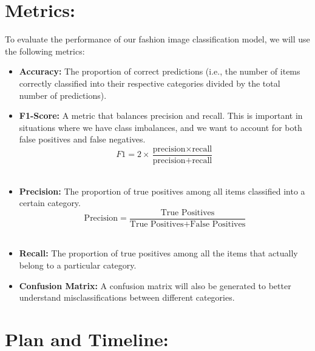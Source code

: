 \documentclass[12pt]{article}
\begin{document}
\section*{Metrics:}
To evaluate the performance of our fashion image classification model, we will use the following metrics:
\begin{itemize}
    \item \textbf{Accuracy:} The proportion of correct predictions (i.e., the number of items correctly classified into their respective categories divided by the total number of predictions).
    \item \textbf{F1-Score:} A metric that balances precision and recall. This is important in situations where we have class imbalances, and we want to account for both false positives and false negatives.
    \begin{equation}
        F1 = 2 \times \frac{\text{precision} \times \text{recall}}{\text{precision} + \text{recall}}
    \end{equation}
    \item \textbf{Precision:} The proportion of true positives among all items classified into a certain category.
    \begin{equation}
        \text{Precision} = \frac{\text{True Positives}}{\text{True Positives} + \text{False Positives}}
    \end{equation}
    \item \textbf{Recall:} The proportion of true positives among all the items that actually belong to a particular category.
    \item \textbf{Confusion Matrix:} A confusion matrix will also be generated to better understand misclassifications between different categories.
\end{itemize}



\section*{Plan and Timeline:}
\end{document}
